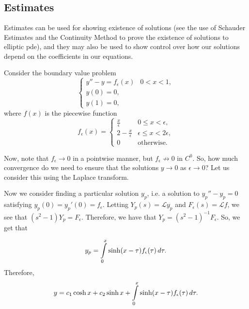 
\subsection{Estimates}

Estimates can be used for showing existence of solutions (see the use of Schauder Estimates and the Continuity Method to prove the existence of solutions to elliptic pde), and they may also be used to show control over how our solutions depend on the coefficients in our equations.

\begin{example}
Consider the boundary value problem
\begin{equation}
\begin{cases}
y'' - y = f_\epsilon(x) & 0<x<1,\\
y(0) = 0,\\
y(1) = 0,
\end{cases}
\end{equation}
where $f(x)$ is the piecewise function
\begin{equation}
f_\epsilon(x) = 
\begin{cases}
\frac{x}{\epsilon} & 0 \leq x < \epsilon,\\
2 - \frac{x}{\epsilon} & \epsilon \leq x < 2\epsilon,\\
0 & \text{otherwise}.
\end{cases}
\end{equation}

Now, note that $f_\epsilon \to 0$ in a pointwise manner, but $f_\epsilon \not \to 0$ in $C^0$. So, how much convergence do we need to ensure that the solutions $y \to 0$ as $\epsilon \to 0$? Let us consider this using the Laplace transform.

Now we consider finding a particular solution $y_p$, i.e. a solution to $y_p'' - y_p=0$ satisfying $y_p(0) = y_p'(0) = f_\epsilon$. Letting $Y_p(s) = \mathcal L y_p$ and $F_\epsilon(s) = \mathcal L f$, we see that $(s^2 - 1)Y_p = F_\epsilon.$ Therefore, we have that $Y_p = (s^2 - 1)^{-1} F_\epsilon$. So, we get that

\begin{equation}
y_p = \int\limits_0^x \sinh(x - \tau) f_\epsilon(\tau) \, d\tau.
\end{equation}
Therefore,
\begin{equation}
y = c_1 \cosh x + c_2 \sinh x + \int\limits_0^x \sinh(x-\tau)f_\epsilon(\tau) \, d\tau.
\end{equation}


\end{example}
